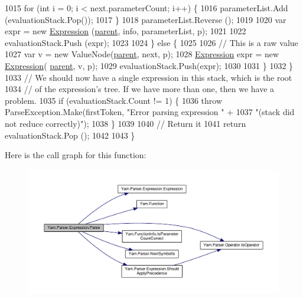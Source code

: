 \begin{DoxyCode}
1015                         \textcolor{keywordflow}{for} (\textcolor{keywordtype}{int} i = 0; i < next.parameterCount; i++) \{
1016                             parameterList.Add (evaluationStack.Pop());
1017                         \}
1018                         parameterList.Reverse ();
1019 
1020                         var expr = \textcolor{keyword}{new} \hyperlink{a00106_a17e5101d02b96d0071e7a0223e4daa3d}{Expression} (\hyperlink{a00150_af313a82103fcc2ff5a177dbb06b92f7b}{parent}, info, parameterList, p);
1021 
1022                         evaluationStack.Push (expr);
1023 
1024                     \} \textcolor{keywordflow}{else} \{
1025 
1026                         \textcolor{comment}{// This is a raw value}
1027                         var v = \textcolor{keyword}{new} ValueNode(\hyperlink{a00150_af313a82103fcc2ff5a177dbb06b92f7b}{parent}, next, p);
1028                         \hyperlink{a00106_a17e5101d02b96d0071e7a0223e4daa3d}{Expression} expr = \textcolor{keyword}{new} \hyperlink{a00106_a17e5101d02b96d0071e7a0223e4daa3d}{Expression}(
      \hyperlink{a00150_af313a82103fcc2ff5a177dbb06b92f7b}{parent}, v, p);
1029                         evaluationStack.Push(expr);
1030 
1031                     \}
1032                 \}
1033                 \textcolor{comment}{// We should now have a single expression in this stack, which is the root}
1034                 \textcolor{comment}{// of the expression's tree. If we have more than one, then we have a problem.}
1035                 \textcolor{keywordflow}{if} (evaluationStack.Count != 1) \{
1036                     \textcolor{keywordflow}{throw} ParseException.Make(firstToken, \textcolor{stringliteral}{"Error parsing expression "} +
1037                         \textcolor{stringliteral}{"(stack did not reduce correctly)"});
1038                 \}
1039 
1040                 \textcolor{comment}{// Return it}
1041                 \textcolor{keywordflow}{return} evaluationStack.Pop ();
1042 
1043             \}
\end{DoxyCode}


Here is the call graph for this function\-:
\nopagebreak
\begin{figure}[H]
\begin{center}
\leavevmode
\includegraphics[width=350pt]{a00106_a686da57aaf67d50d2832f9ee0028a979_cgraph}
\end{center}
\end{figure}


